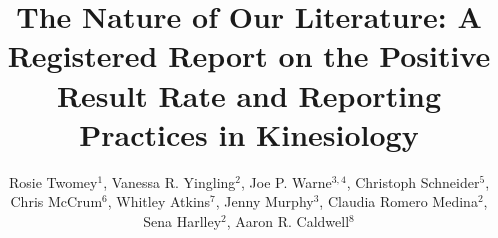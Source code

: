\documentclass[]{cik}%
\begin{document}
\title{The Nature of Our Literature: A Registered Report on the Positive
Result Rate and Reporting Practices in Kinesiology}

\author{
Rosie Twomey$^{1}$,
Vanessa R. Yingling$^{2}$,
Joe P. Warne$^{3, 4}$,
Christoph Schneider$^{5}$,
Chris McCrum$^{6}$,
Whitley Atkins$^{7}$,
Jenny Murphy$^{3}$,
Claudia Romero Medina$^{2}$,
Sena Harlley$^{2}$,
Aaron R. Caldwell$^{8}$}

\address{
  $^{1}$Cumming School of Medicine, University of Calgary, Calgary, AB,
Canada.\\
  $^{2}$Department of Kinesiology, California State University, East
Bay, CA, USA.\\
  $^{3}$Centre of Applied Science for Health, Technological University
Dublin, Tallaght, Dublin, Ireland.\\
  $^{4}$Setanta College, Thurles Chamber of Commerce, Tipperary,
Ireland.\\
  $^{5}$Faculty of Sport Science, Ruhr University Bochum, Bochum,
Germany.\\
  $^{6}$Department of Nutrition and Movement Sciences, NUTRIM School of
Nutrition and Translational Research in Metabolism, Maastricht
University, Maastricht, The Netherlands.\\
  $^{7}$Department of Health, Human Performance and Recreation,
University of Arkansas, Fayetteville, AR, USA.\\
  $^{8}$Society for Transparency, Openess, and Replication in
Kinesiology, Hayward, CA, USA.}
\subject{
metascience}




\end{document}

